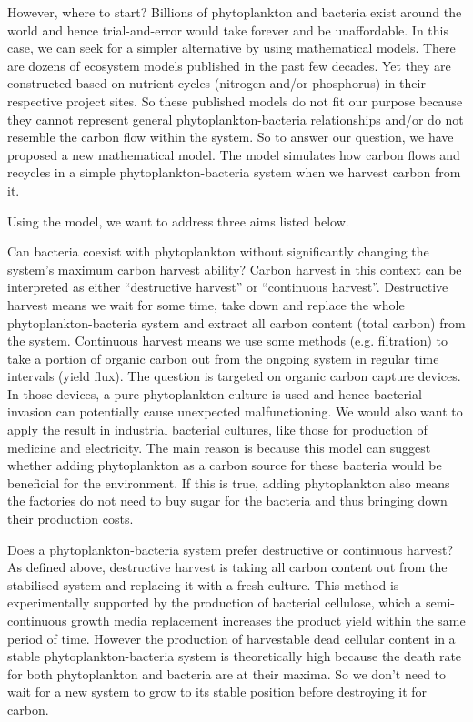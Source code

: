 \documentclass[../thesis.tex]{subfiles} %
\begin{document}
However, where to start?  Billions of phytoplankton and bacteria exist around the world and hence trial-and-error would take forever and be unaffordable.  In this case, we can seek for a simpler alternative by using mathematical models.  There are dozens of ecosystem models published in the past few decades.  Yet they are constructed based on nutrient cycles (nitrogen and/or phosphorus) in their respective project sites.  So these published models do not fit our purpose because they cannot represent general phytoplankton-bacteria relationships and/or do not resemble the carbon flow within the system.  So to answer our question, we have proposed a new mathematical model.  The model simulates how carbon flows and recycles in a simple phytoplankton-bacteria system when we harvest carbon from it.

Using the model, we want to address three aims listed below.

Can bacteria coexist with phytoplankton without significantly changing the system’s maximum carbon harvest ability?  Carbon harvest in this context can be interpreted as either ``destructive harvest” or ``continuous harvest”.  Destructive harvest means we wait for some time, take down and replace the whole phytoplankton-bacteria system and extract all carbon content (total carbon) from the system.  Continuous harvest means we use some methods (e.g. filtration) to take a portion of organic carbon out from the ongoing system in regular time intervals (yield flux).  The question is targeted on organic carbon capture devices.  In those devices, a pure phytoplankton culture is used and hence bacterial invasion can potentially cause unexpected malfunctioning.  We would also want to apply the result in industrial bacterial cultures, like those for production of medicine and electricity.  The main reason is because this model can suggest whether adding phytoplankton as a carbon source for these bacteria would be beneficial for the environment.  If this is true, adding phytoplankton also means the factories do not need to buy sugar for the bacteria and thus bringing down their production costs.

Does a phytoplankton-bacteria system prefer destructive or continuous harvest?  As defined above, destructive harvest is taking all carbon content out from the stabilised system and replacing it with a fresh culture.  This method is experimentally supported by the production of bacterial cellulose, which a semi-continuous growth media replacement increases the product yield within the same period of time.  However the production of harvestable dead cellular content in a stable phytoplankton-bacteria system is theoretically high because the death rate for both phytoplankton and bacteria are at their maxima.  So we don’t need to wait for a new system to grow to its stable position before destroying it for carbon.
\end{document}
